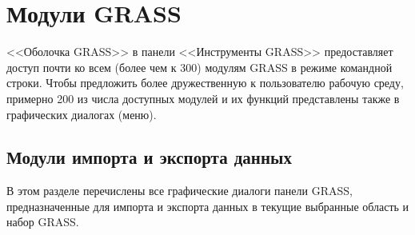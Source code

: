 \chapter{Модули GRASS}\label{appdx_grass_toolbox_modules}


<<Оболочка GRASS>> в панели <<Инструменты GRASS>> предоставляет доступ почти ко всем
(более чем к 300) модулям GRASS в режиме командной строки. Чтобы предложить
более дружественную к пользователю рабочую среду, примерно 200 из числа
доступных модулей и их функций представлены также в графических диалогах
(меню).

\section{Модули импорта и экспорта данных}

В этом разделе перечислены все графические диалоги панели GRASS,
предназначенные для импорта и экспорта данных в текущие выбранные область
и набор GRASS.

